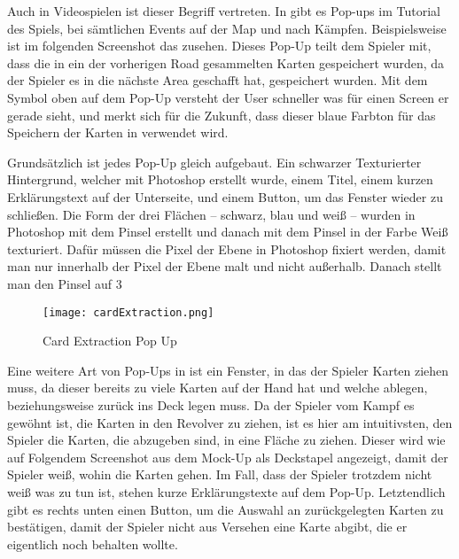 Auch in Videospielen ist dieser Begriff vertreten. In \FF gibt es Pop-ups im Tutorial des Spiels, bei sämtlichen Events auf der Map und nach Kämpfen. Beispielsweise ist im folgenden Screenshot das  zusehen. Dieses Pop-Up teilt dem Spieler mit, dass die in ein der vorherigen Road gesammelten Karten gespeichert wurden, da der Spieler es in die nächste Area geschafft hat, gespeichert wurden. Mit dem Symbol oben auf dem Pop-Up versteht der User schneller was für einen Screen er gerade sieht, und merkt sich für die Zukunft, dass dieser blaue Farbton für das Speichern der Karten in \FF verwendet wird.

Grundsätzlich ist jedes Pop-Up gleich aufgebaut. Ein schwarzer Texturierter Hintergrund, welcher mit Photoshop erstellt wurde, einem Titel, einem kurzen Erklärungstext auf der Unterseite, und einem Button, um das Fenster wieder zu schließen. Die Form der drei Flächen – schwarz, blau und weiß – wurden in Photoshop mit dem  Pinsel erstellt und danach mit dem
 Pinsel in der Farbe Weiß texturiert. Dafür müssen die Pixel der Ebene in Photoshop fixiert werden, damit man nur innerhalb der Pixel der Ebene malt und nicht außerhalb. Danach stellt man den Pinsel auf 3\\%

\begin{figure}[H]
    \centering
    \texttt{[image: cardExtraction.png]}
    \caption{Card Extraction Pop Up}
\end{figure}

Eine weitere Art von Pop-Ups in \FF ist ein Fenster, in das der Spieler Karten ziehen muss, da dieser bereits zu viele Karten auf der Hand hat und welche ablegen, beziehungsweise zurück ins Deck legen muss. Da der Spieler vom Kampf es gewöhnt ist, die Karten in den Revolver zu ziehen, ist es hier am intuitivsten, den Spieler die Karten, die abzugeben sind, in eine Fläche zu ziehen. Dieser wird wie auf Folgendem Screenshot aus dem Mock-Up als Deckstapel angezeigt, damit der Spieler weiß, wohin die Karten gehen. Im Fall, dass der Spieler trotzdem nicht weiß was zu tun ist, stehen kurze Erklärungstexte auf dem Pop-Up. Letztendlich gibt es rechts unten einen Button, um die Auswahl an zurückgelegten Karten zu bestätigen, damit der Spieler nicht aus Versehen eine Karte abgibt, die er eigentlich noch behalten wollte.

